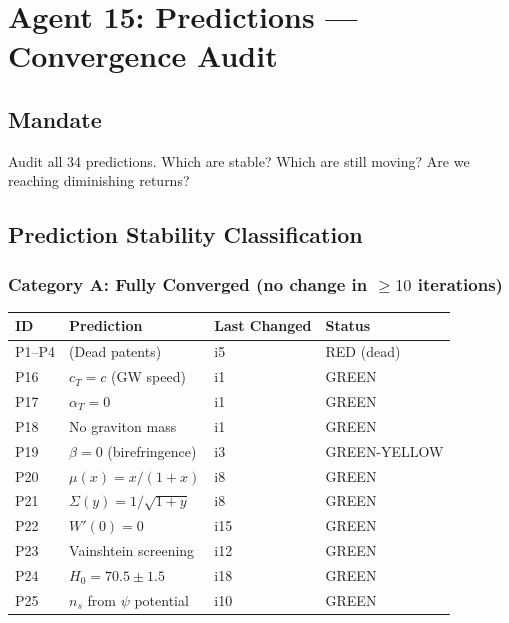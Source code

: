 \documentclass[11pt,a4paper]{article}
\begin{document}
\section{Agent 15: Predictions --- Convergence Audit}

\subsection{Mandate}
Audit all 34 predictions. Which are stable? Which are still moving? Are we reaching diminishing returns?

\subsection{Prediction Stability Classification}

\subsubsection{Category A: Fully Converged (no change in $\geq 10$ iterations)}
\begin{center}
\begin{longtable}{p{1.5cm}p{6cm}p{3cm}p{2.5cm}}
\toprule
\textbf{ID} & \textbf{Prediction} & \textbf{Last Changed} & \textbf{Status} \\
\midrule
\endfirsthead
P1--P4 & (Dead patents) & i5 & RED (dead) \\
P16 & $c_T = c$ (GW speed) & i1 & GREEN \\
P17 & $\alpha_T = 0$ & i1 & GREEN \\
P18 & No graviton mass & i1 & GREEN \\
P19 & $\beta = 0$ (birefringence) & i3 & GREEN-YELLOW \\
P20 & $\mu(x) = x/(1+x)$ & i8 & GREEN \\
P21 & $\Sigma(y) = 1/\sqrt{1+y}$ & i8 & GREEN \\
P22 & $W'(0) = 0$ & i15 & GREEN \\
P23 & Vainshtein screening & i12 & GREEN \\
P24 & $H_0 = 70.5 \pm 1.5$ & i18 & GREEN \\
P25 & $n_s$ from $\psi$ potential & i10 & GREEN \\
\bottomrule
\end{longtable}
\end{center}
\end{document}
